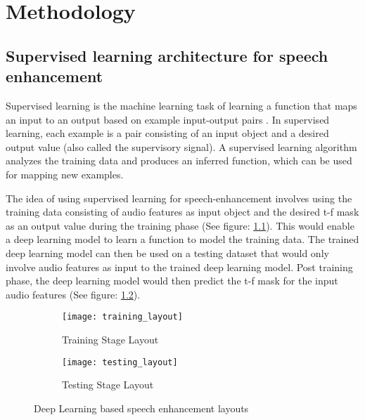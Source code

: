 
\chapter{Methodology} %

\label{Chapter2} %


\section{Supervised learning architecture for speech enhancement}
Supervised learning is the machine learning task of learning a function that maps an input to an output based on example input-output pairs \cite{wiki:sl}. In supervised learning, each example is a pair consisting of an input object and a desired output value (also called the supervisory signal). A supervised learning algorithm analyzes the training data and produces an inferred function, which can be used for mapping new examples.\par
The idea of using supervised learning for speech-enhancement involves using the training data consisting of audio features as input object and the desired t-f mask as an output value during the training phase (See figure: \ref{fig:training_layout}). This would enable a deep learning model to learn a function to model the training data. The trained deep learning model can then be used on a testing dataset that would only involve audio features as input to the trained deep learning model. Post training phase, the deep learning model would then predict the t-f mask for the input audio features (See figure: \ref{fig:testing_layout}).\par
\begin{figure}
\centering
\begin{subfigure}{.5\textwidth}
  \centering
  \texttt{[image: training\_layout]}
  \caption{Training Stage Layout}
  \label{fig:training_layout}
\end{subfigure}%
\begin{subfigure}{.5\textwidth}
  \centering
  \texttt{[image: testing\_layout]}
  \caption{Testing Stage Layout}
  \label{fig:testing_layout}
\end{subfigure}
\caption{Deep Learning based speech enhancement layouts}
\label{fig:layouts}
\end{figure}
